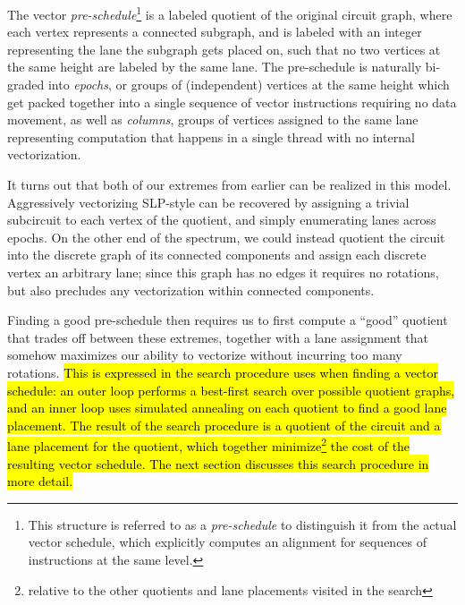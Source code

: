 The vector {\em pre-schedule}\footnote{This structure is referred to as a {\em pre-schedule} to distinguish it from the actual vector schedule, which explicitly computes an alignment for sequences of instructions at the same level. %
} is a labeled quotient of the original circuit graph, where each vertex represents a connected subgraph, and is labeled with an integer representing the lane the subgraph gets placed on, such that no two vertices at the same height are labeled by the same lane.
The pre-schedule is naturally bi-graded into {\em epochs}, or groups of (independent) vertices at the same height which get packed together into a single sequence of vector instructions requiring no data movement, as well as {\em columns}, groups of vertices assigned to the same lane representing computation that happens in a single thread with no internal vectorization.

It turns out that both of our extremes from earlier can be realized in this model.
Aggressively vectorizing SLP-style can be recovered by assigning a trivial subcircuit to each vertex of the quotient, and simply enumerating lanes across epochs.
On the other end of the spectrum, we could instead quotient the circuit into the discrete graph of its connected components and assign each discrete vertex an arbitrary lane; since this graph has no edges it requires no rotations, but also precludes any vectorization within connected components.

Finding a good pre-schedule then requires us to first compute a ``good'' quotient that trades off between these extremes, together with a lane assignment that somehow maximizes our ability to vectorize without incurring too many rotations.
\hl{This is expressed in the search procedure {\system} uses when finding a vector schedule: an outer loop performs a best-first search over possible quotient graphs, and an inner loop uses simulated annealing on each quotient to find a good lane placement.
The result of the search procedure is a quotient of the circuit and a lane placement for the quotient, which together minimize\footnote{relative to the other quotients and lane placements visited in the search} the cost of the resulting vector schedule. %
The next section discusses this search procedure in more detail.}

